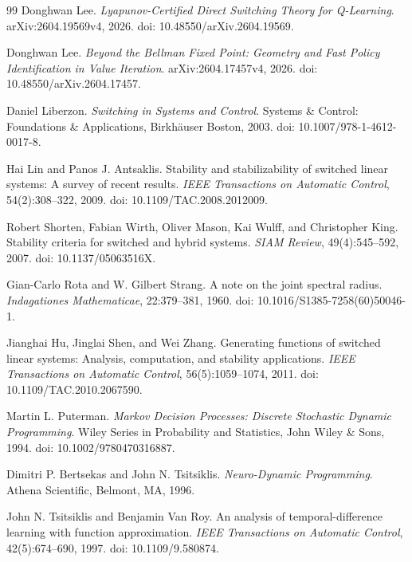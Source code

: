 \documentclass[letterpaper]{article}
\numberwithin{equation}{section}
\begin{document}
\begin{thebibliography}{99}
Donghwan Lee.
\newblock \emph{Lyapunov-Certified Direct Switching Theory for Q-Learning}.
\newblock arXiv:2604.19569v4, 2026.
\newblock doi: 10.48550/arXiv.2604.19569.

Donghwan Lee.
\newblock \emph{Beyond the Bellman Fixed Point: Geometry and Fast Policy Identification in Value Iteration}.
\newblock arXiv:2604.17457v4, 2026.
\newblock doi: 10.48550/arXiv.2604.17457.

Daniel Liberzon.
\newblock \emph{Switching in Systems and Control}.
\newblock Systems \& Control: Foundations \& Applications, Birkh\"auser Boston, 2003.
\newblock doi: 10.1007/978-1-4612-0017-8.

Hai Lin and Panos J. Antsaklis.
\newblock Stability and stabilizability of switched linear systems: A survey of recent results.
\newblock \emph{IEEE Transactions on Automatic Control}, 54(2):308--322, 2009.
\newblock doi: 10.1109/TAC.2008.2012009.

Robert Shorten, Fabian Wirth, Oliver Mason, Kai Wulff, and Christopher King.
\newblock Stability criteria for switched and hybrid systems.
\newblock \emph{SIAM Review}, 49(4):545--592, 2007.
\newblock doi: 10.1137/05063516X.

Gian-Carlo Rota and W. Gilbert Strang.
\newblock A note on the joint spectral radius.
\newblock \emph{Indagationes Mathematicae}, 22:379--381, 1960.
\newblock doi: 10.1016/S1385-7258(60)50046-1.

Jianghai Hu, Jinglai Shen, and Wei Zhang.
\newblock Generating functions of switched linear systems: Analysis, computation, and stability applications.
\newblock \emph{IEEE Transactions on Automatic Control}, 56(5):1059--1074, 2011.
\newblock doi: 10.1109/TAC.2010.2067590.

Martin L. Puterman.
\newblock \emph{Markov Decision Processes: Discrete Stochastic Dynamic Programming}.
\newblock Wiley Series in Probability and Statistics, John Wiley \& Sons, 1994.
\newblock doi: 10.1002/9780470316887.

Dimitri P. Bertsekas and John N. Tsitsiklis.
\newblock \emph{Neuro-Dynamic Programming}.
\newblock Athena Scientific, Belmont, MA, 1996.

John N. Tsitsiklis and Benjamin Van Roy.
\newblock An analysis of temporal-difference learning with function approximation.
\newblock \emph{IEEE Transactions on Automatic Control}, 42(5):674--690, 1997.
\newblock doi: 10.1109/9.580874.

\end{thebibliography}
\end{document}
